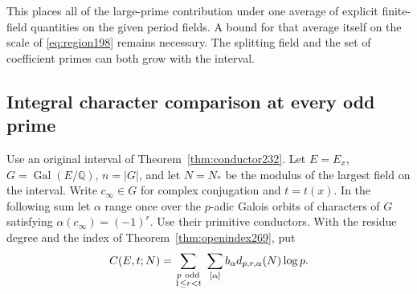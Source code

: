 \documentclass[a4paper,11pt]{article}
\theoremstyle{definition}
\theoremstyle{remark}
\numberwithin{equation}{section}
\begin{document}
This places all of the large-prime contribution under one
average of explicit finite-field quantities on the given
period fields. A bound for that average itself on the scale
of \eqref{eq:region198} remains necessary. The splitting field
and the set of coefficient primes can both grow with the interval.

\subsection{Integral character comparison at every odd prime}\label{nav:IV-42}
Use an original interval of Theorem~\ref{thm:conductor232}.
Let \(E=E_x\), \(G=\operatorname{Gal}(E/\mathbb Q)\),
\(n=|G|\), and let \(N=N_*\) be the modulus of the largest
field on the interval. Write \(c_\infty\in G\) for complex
conjugation and \(t=t(x)\). In the following sum let \(\alpha\)
range once over the \(p\)-adic Galois orbits of characters of
\(G\) satisfying \(\alpha(c_\infty)=(-1)^r\). Use their
primitive conductors. With the residue degree and the index of
Theorem~\ref{thm:openindex269}, put
\[
 C(E,t;N)=\sum_{\substack{p\ {\rm odd}\\1\le r<t}}
                 \ \sum_{[\alpha]} b_\alpha
                      d_{p,r,\alpha}(N)\log p .
\]
\end{document}
